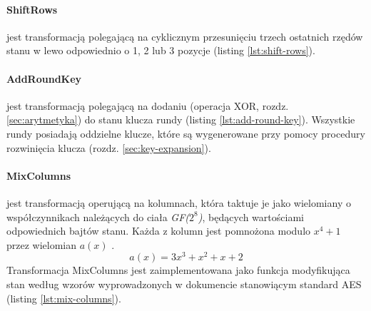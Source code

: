 \paragraph{ShiftRows} \cite[rozdz. 5.1.2]{aes-standard} jest transformacją polegającą na cyklicznym przesunięciu trzech ostatnich rzędów stanu w lewo odpowiednio o 1, 2 lub 3 pozycje \cite[rys. 8]{aes-standard} (listing \ref{lst:shift-rows}).

\paragraph{AddRoundKey} \cite[rozdz. 5.1.3]{aes-standard} jest transformacją polegającą na dodaniu (operacja XOR, rozdz. \ref{sec:arytmetyka}) do stanu klucza rundy \cite[rys. 10]{aes-standard} (listing \ref{lst:add-round-key}). Wszystkie rundy posiadają oddzielne klucze, które są wygenerowane przy pomocy procedury rozwinięcia klucza (rozdz. \ref{sec:key-expansion}).

\paragraph{MixColumns} \cite[rozdz. 5.1.3]{aes-standard} jest transformacją operującą na kolumnach, która taktuje je jako wielomiany o współczynnikach należących do ciała \textit{GF($2^8$)}, będących wartościami odpowiednich bajtów stanu. Każda z kolumn jest pomnożona modulo $x^4 + 1$ przez wielomian $a(x)$ \cite[rys. 9]{aes-standard}.
\begin{equation*}
a(x) = 3x^3 + x^2 + x + 2
\end{equation*}
Transformacja MixColumns jest zaimplementowana jako funkcja modyfikująca stan według wzorów wyprowadzonych w dokumencie stanowiącym standard AES \cite[rozdz. 5.1.3]{aes-standard} (listing \ref{lst:mix-columns}).


